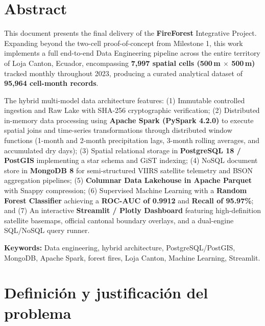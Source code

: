 \documentclass[11pt,a4paper]{article}
\begin{document}
\vspace{0.6cm}
\section*{Abstract}

This document presents the final delivery of the \textbf{FireForest} Integrative Project. Expanding beyond the two-cell proof-of-concept from Milestone 1, this work implements a full end-to-end Data Engineering pipeline across the entire territory of Loja Canton, Ecuador, encompassing \textbf{7,997 spatial cells (500\,m $\times$ 500\,m)} tracked monthly throughout 2023, producing a curated analytical dataset of \textbf{95,964 cell-month records}.

The hybrid multi-model data architecture features: (1) Immutable controlled ingestion and Raw Lake with SHA-256 cryptographic verification; (2) Distributed in-memory data processing using \textbf{Apache Spark (PySpark 4.2.0)} to execute spatial joins and time-series transformations through distributed window functions (1-month and 2-month precipitation lags, 3-month rolling averages, and accumulated dry days); (3) Spatial relational storage in \textbf{PostgreSQL 18 / PostGIS} implementing a star schema and GiST indexing; (4) NoSQL document store in \textbf{MongoDB 8} for semi-structured VIIRS satellite telemetry and BSON aggregation pipelines; (5) \textbf{Columnar Data Lakehouse in Apache Parquet} with Snappy compression; (6) Supervised Machine Learning with a \textbf{Random Forest Classifier} achieving a \textbf{ROC-AUC of 0.9912} and \textbf{Recall of 95.97\%}; and (7) An interactive \textbf{Streamlit / Plotly Dashboard} featuring high-definition satellite basemaps, official cantonal boundary overlays, and a dual-engine SQL/NoSQL query runner.

\vspace{0.4cm}
\noindent\textbf{Keywords:} Data engineering, hybrid architecture, PostgreSQL/PostGIS, MongoDB, Apache Spark, forest fires, Loja Canton, Machine Learning, Streamlit.

\newpage

\section{Definici\'on y justificaci\'on del problema}
\end{document}
